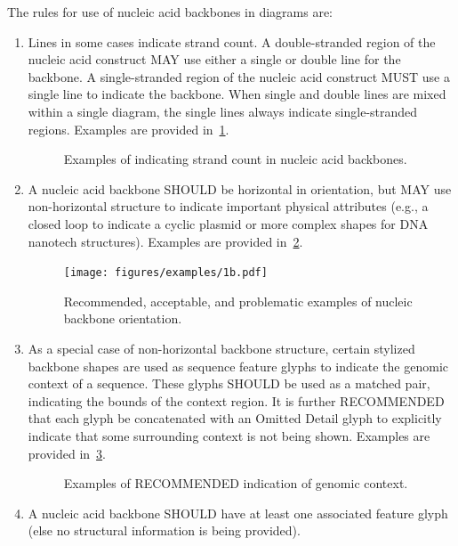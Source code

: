 The rules for use of nucleic acid backbones in diagrams are:
\begin{enumerate}
\item Lines in some cases indicate strand count. 
	A double-stranded region of the nucleic acid construct MAY use either a single or double line for the backbone.  
	A single-stranded region of the nucleic acid construct MUST use a single line to indicate the backbone.
	When single and double lines are mixed within a single diagram, the single lines always indicate single-stranded regions.
	Examples are provided in~\ref{exa:1a}.
	
	\begin{figure}[h!]
	\centering
	\caption{Examples of indicating strand count in nucleic acid backbones.}
	\label{exa:1a}
	\end{figure}
		
\item A nucleic acid backbone SHOULD be horizontal in orientation, 
	but MAY use non-horizontal structure to indicate important physical attributes 
	(e.g., a closed loop to indicate a cyclic plasmid or more complex shapes for DNA nanotech structures).   
	Examples are provided in~\ref{exa:1b}.
	
	\begin{figure}[h!]
	\centering
	\texttt{[image: figures/examples/1b.pdf]}
	\caption{Recommended, acceptable, and problematic examples of nucleic backbone orientation.}
	\label{exa:1b}
	\end{figure}
	
\item As a special case of non-horizontal backbone structure, certain stylized backbone shapes are used as sequence feature glyphs to indicate the genomic context of a sequence. 
	These glyphs SHOULD be used as a matched pair, indicating the bounds of the context region.
	It is further RECOMMENDED that each glyph be concatenated with an Omitted Detail glyph to explicitly indicate that some surrounding context is not being shown. 
	Examples are provided in~\ref{exa:1c}.

	\begin{figure}[h!]
	\centering
	\caption{Examples of RECOMMENDED indication of genomic context.}
	\label{exa:1c}
	\end{figure}

\item A nucleic acid backbone SHOULD have at least one associated feature glyph (else no structural information is being provided).
\end{enumerate}


